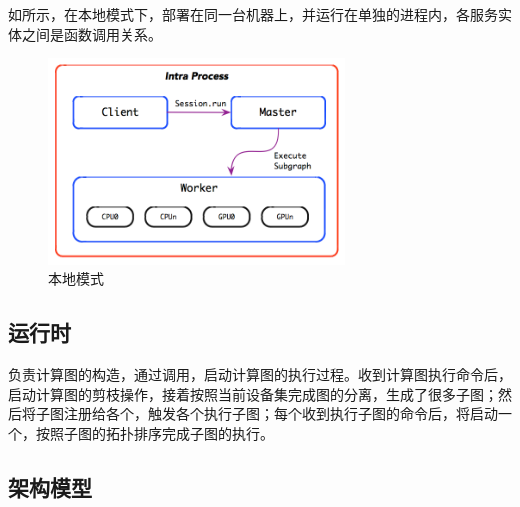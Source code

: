\begin{content}

如所示，在本地模式下，部署在同一台机器上，并运行在单独的进程内，各服务实体之间是函数调用关系。

\begin{figure}[H]
\centering
\includegraphics[width=0.7\textwidth]{figures/local.png}
\caption{本地模式}
 \label{fig:local}
\end{figure}

\subsection{运行时}

负责计算图的构造，通过调用，启动计算图的执行过程。收到计算图执行命令后，启动计算图的剪枝操作，接着按照当前设备集完成图的分离，生成了很多子图；然后将子图注册给各个，触发各个执行子图；每个收到执行子图的命令后，将启动一个，按照子图的拓扑排序完成子图的执行。

\subsection{架构模型}


\end{content}
